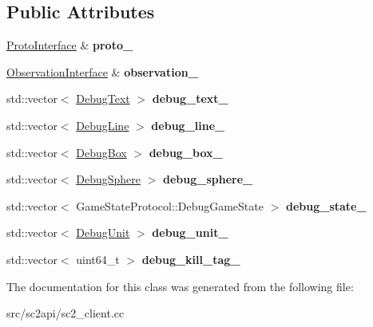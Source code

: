 \subsection*{Public Attributes}
\begin{DoxyCompactItemize}
\item 
\mbox{\label{classsc2_1_1_debug_imp_a48be237f7116b2fc08d1fdc3be858dd8}} 
\hyperlink{classsc2_1_1_proto_interface}{Proto\+Interface} \& {\bfseries proto\+\_\+}
\item 
\mbox{\label{classsc2_1_1_debug_imp_a1c2da1da79b4d909686d7401267a72d3}} 
\hyperlink{classsc2_1_1_observation_interface}{Observation\+Interface} \& {\bfseries observation\+\_\+}
\item 
\mbox{\label{classsc2_1_1_debug_imp_aa761ffd3eb727006e6e35de2320655ac}} 
std\+::vector$<$ \hyperlink{structsc2_1_1_debug_imp_1_1_debug_text}{Debug\+Text} $>$ {\bfseries debug\+\_\+text\+\_\+}
\item 
\mbox{\label{classsc2_1_1_debug_imp_abd6e30fc9488495a50c45512a8e7693c}} 
std\+::vector$<$ \hyperlink{structsc2_1_1_debug_imp_1_1_debug_line}{Debug\+Line} $>$ {\bfseries debug\+\_\+line\+\_\+}
\item 
\mbox{\label{classsc2_1_1_debug_imp_a3674150683ef32b284e03acda65be2bd}} 
std\+::vector$<$ \hyperlink{structsc2_1_1_debug_imp_1_1_debug_box}{Debug\+Box} $>$ {\bfseries debug\+\_\+box\+\_\+}
\item 
\mbox{\label{classsc2_1_1_debug_imp_a52c63358f1e97ae2e02c8873eff9f863}} 
std\+::vector$<$ \hyperlink{structsc2_1_1_debug_imp_1_1_debug_sphere}{Debug\+Sphere} $>$ {\bfseries debug\+\_\+sphere\+\_\+}
\item 
\mbox{\label{classsc2_1_1_debug_imp_ab66f812b85db16f233c6c0e2e8bffe7d}} 
std\+::vector$<$ Game\+State\+Protocol\+::\+Debug\+Game\+State $>$ {\bfseries debug\+\_\+state\+\_\+}
\item 
\mbox{\label{classsc2_1_1_debug_imp_a9cb293d47096e4fe51d0dc7115430685}} 
std\+::vector$<$ \hyperlink{structsc2_1_1_debug_imp_1_1_debug_unit}{Debug\+Unit} $>$ {\bfseries debug\+\_\+unit\+\_\+}
\item 
\mbox{\label{classsc2_1_1_debug_imp_a0fb317998e18471652a4d533b780a282}} 
std\+::vector$<$ uint64\+\_\+t $>$ {\bfseries debug\+\_\+kill\+\_\+tag\+\_\+}
\end{DoxyCompactItemize}


The documentation for this class was generated from the following file\+:\begin{DoxyCompactItemize}
\item 
src/sc2api/sc2\+\_\+client.\+cc\end{DoxyCompactItemize}
